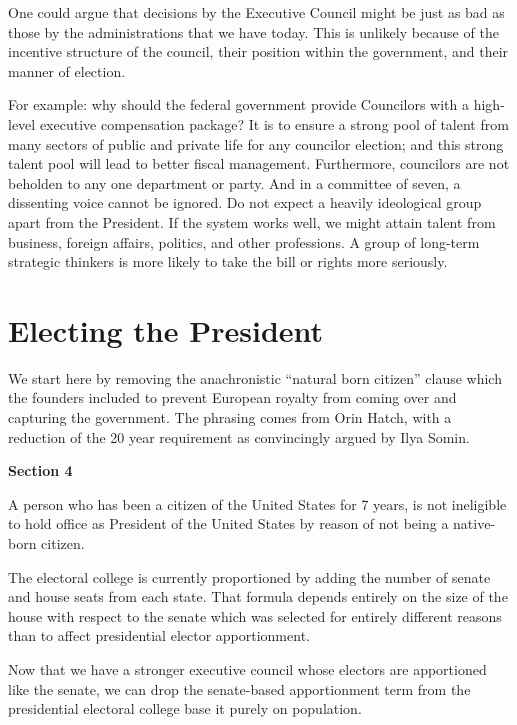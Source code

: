 \documentclass{article}
\begin{document}
One could argue that decisions by the Executive Council might be just as bad as those by the administrations that we have today. This is unlikely because of the incentive structure of the council, their position within the government, and their manner of election.

For example: why should the federal government provide Councilors with a high-level executive compensation package? It is to ensure a strong pool of talent from many sectors of public and private life for any councilor election; and this strong talent pool will lead to better fiscal management. Furthermore, councilors are not beholden to any one department or party. And in a committee of seven, a dissenting voice cannot be ignored. Do not expect a heavily ideological group apart from the President. If the system works well, we might attain talent from business, foreign affairs, politics, and other professions. A group of long-term strategic thinkers is more likely to take the bill or rights more seriously.

\section{Electing the President}

We start here by removing the anachronistic “natural born citizen” clause which the founders included to prevent European royalty from coming over and capturing the government. The phrasing comes from Orin Hatch\cite{Somin_Hatch}, with a reduction of the 20 year requirement as convincingly argued by Ilya Somin\cite{Somin_NBC}.

\begin{quoting}
\textbf{Section 4}

A person who has been a citizen of the United States for 7 years, is not ineligible to hold office as President of the United States by reason of not being a native-born citizen.
\end{quoting}

The electoral college is currently proportioned by adding the number of senate and house seats from each state. That formula depends entirely on the size of the house with respect to the senate which was selected for entirely different reasons than to affect presidential elector apportionment.

Now that we have a stronger executive council whose electors are apportioned like the senate, we can drop the senate-based apportionment term from the presidential electoral college base it purely on population.
\end{document}
